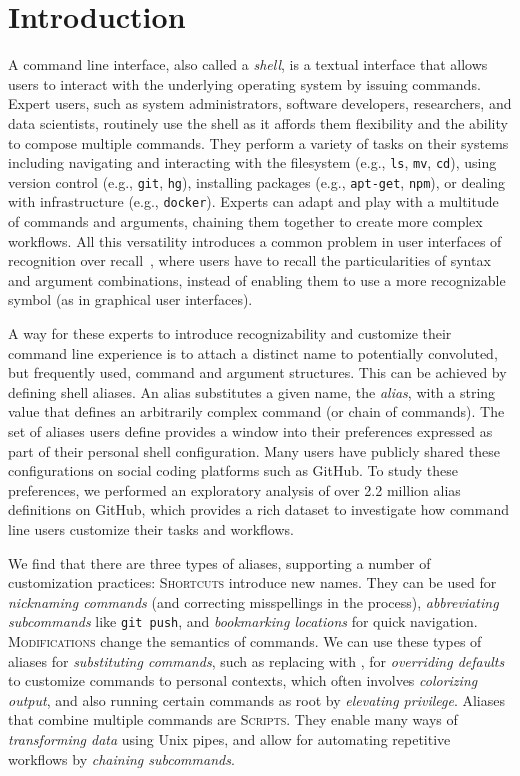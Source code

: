 \section{Introduction}

A command line interface, also called a \emph{shell}, is a textual interface that allows users to interact with the underlying operating system by issuing commands.
Expert users, such as system administrators, software developers, researchers, and data scientists, routinely use the shell as it affords them flexibility and the ability to compose multiple commands.
They perform a variety of tasks on their systems including navigating and interacting with the filesystem (e.g., \verb|ls|, \verb|mv|, \verb|cd|), using version control (e.g., \verb|git|, \verb|hg|), installing packages (e.g., \verb|apt-get|, \verb|npm|), or dealing with infrastructure (e.g., \verb|docker|).
Experts can adapt and play with a multitude of commands and arguments, chaining them together to create more complex workflows.
All this versatility introduces a common problem in user interfaces of recognition over recall~\cite{nielsen:05}, where users have to recall the particularities of syntax and argument combinations, instead of enabling them to use a more recognizable symbol (as in graphical user interfaces).

A way for these experts to introduce recognizability and customize their command line experience is to attach a distinct name to potentially convoluted, but frequently used, command and argument structures.
This can be achieved by defining shell aliases.
An alias substitutes a given name, the \emph{alias}, with a string value that defines an arbitrarily complex command (or chain of commands).
The set of aliases users define provides a window into their preferences expressed as part of their personal shell configuration.
Many users have publicly shared these configurations on social coding platforms such as GitHub.
To study these preferences, we performed an exploratory analysis of over 2.2 million alias definitions on GitHub, which provides a rich dataset to investigate how command line users customize their tasks and workflows.

We find that there are three types of aliases, supporting a number of customization practices:
\textsc{Shortcuts} introduce new names.
They can be used for \emph{nicknaming commands} (and correcting misspellings in the process),
\emph{abbreviating subcommands} like \texttt{git push},
and \emph{bookmarking locations} for quick navigation.
\textsc{Modifications} change the semantics of commands.
We can use these types of aliases for \emph{substituting commands}, such as replacing  with ,
for \emph{overriding defaults} to customize commands to personal contexts, 
which often involves \emph{colorizing output},
and also running certain commands as root by \emph{elevating privilege}.
Aliases that combine multiple commands are \textsc{Scripts}.
They enable many ways of \emph{transforming data} using Unix pipes, 
and allow for automating repetitive workflows by \emph{chaining subcommands}.

